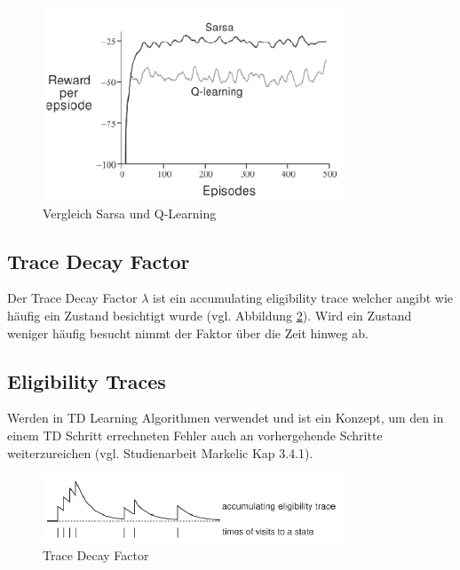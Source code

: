 \documentclass[10pt]{scrartcl}
\begin{document}
\begin{figure}[htbp]
	\centering	\includegraphics[width=0.8\textwidth]{Bilder/Cliff_Ergebnisse.png}
	\caption{Vergleich Sarsa und Q-Learning}
	\label{fig:Cliff_Result}
\end{figure}


\subsection{Trace Decay Factor}
Der Trace Decay Factor $\lambda$ ist ein \glqq accumulating eligibility trace\grqq\xspace welcher angibt wie häufig ein Zustand besichtigt wurde (vgl. Abbildung \ref{fig:Trace}). Wird ein Zustand weniger häufig besucht nimmt der Faktor über die Zeit hinweg ab.\\
\subsection{Eligibility Traces}
Werden in TD Learning Algorithmen verwendet und ist ein Konzept, um den in einem TD
Schritt errechneten Fehler auch an vorhergehende Schritte weiterzureichen (vgl. Studienarbeit
Markelic Kap 3.4.1).

\begin{figure}[htbp]
	\centering	\includegraphics[width=0.8\textwidth]{Bilder/TraceDecay.png}
	\caption{Trace Decay Factor}
	\label{fig:Trace}
\end{figure}
\end{document}
